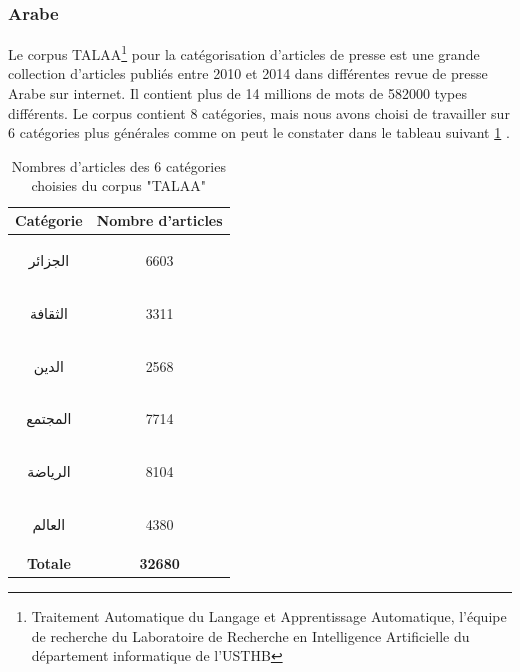     \subsubsection{Arabe}
    Le corpus TALAA\footnote{Traitement Automatique du Langage et Apprentissage Automatique, l'équipe de recherche du Laboratoire de Recherche en Intelligence Artificielle du département informatique de l'USTHB} pour la catégorisation d'articles de presse est une grande collection d'articles publiés entre 2010 et 2014 dans différentes revue de presse Arabe sur internet. Il contient plus de 14 millions de mots de 582000 types différents. Le corpus contient 8 catégories, mais nous avons choisi de travailler sur 6 catégories plus générales comme on peut le constater dans le tableau suivant \ref{talaa-categ} \cite{talaa}. 
    \begin{table}[H]
        \begin{center}
            \begin{tabular}{|c|c|}
                \hline
                \textbf{Catégorie} &  \textbf{Nombre d'articles} \\
                \hline
                \begin{arab}الجزائر\end{arab} & 6603 \\
                \begin{arab}الثقافة\end{arab} & 3311 \\
                \begin{arab}الدين\end{arab} & 2568 \\
                \begin{arab}المجتمع\end{arab} & 7714 \\
                \begin{arab}الرياضة\end{arab} & 8104 \\
                \begin{arab}العالم\end{arab} & 4380 \\
                \textbf{Totale} & \textbf{32680} \\
                \hline
            \end{tabular}
        \end{center}
        \caption{Nombres d'articles des 6 catégories choisies du corpus "TALAA"}
        \label{talaa-categ}
    \end{table}

